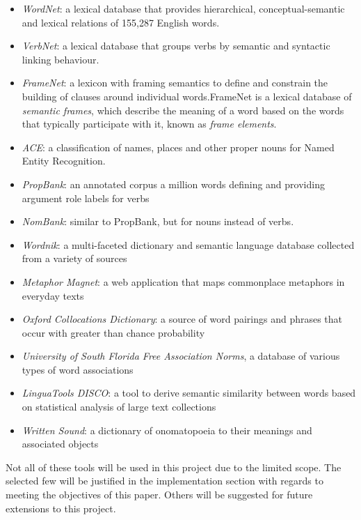 \begin{itemize}
\item{\textit{WordNet}: a lexical database that provides hierarchical, conceptual-semantic and lexical relations of 155,287 English words.\cite{miller1995wordnet}}
\item{\textit{VerbNet}: a lexical database that groups verbs by semantic and syntactic linking behaviour.\cite{schuler2005verbnet}}
\item{\textit{FrameNet}: a lexicon with framing semantics to define and constrain the building of clauses around individual words.FrameNet\cite{baker1998berkeley} is a lexical database of \textit{semantic frames}, which describe the meaning of a word based on the words that typically participate with it, known as \textit{frame elements}.\cite{baker1998berkeley}}
\item{\textit{ACE}: a classification of names, places and other proper nouns for Named Entity Recognition.\cite{doddington2004automatic}}
\item{\textit{PropBank}: an annotated corpus a million words defining and providing argument role labels for verbs\cite{kingsbury2002treebank}}
\item{\textit{NomBank}: similar to PropBank, but for nouns instead of verbs.\cite{meyers2004nombank}}
\item{\textit{Wordnik}: a multi-faceted dictionary and semantic language database collected from a variety of sources\cite{wordnik}}
\item{\textit{Metaphor Magnet}: a web application that maps commonplace metaphors in everyday texts\cite{vealespecifying}}
\item{\textit{Oxford Collocations Dictionary}: a source of word pairings and phrases that occur with greater than chance probability\cite{crowther2003oxford}}
\item{\textit{University of South Florida Free Association Norms}, a database of various types of word associations\cite{nelson2004university}}
\item{\textit{LinguaTools DISCO}: a tool to derive semantic similarity between words based on statistical analysis of large text collections\cite{kolb2008disco}}
\item{\textit{Written Sound}: a dictionary of onomatopoeia to their meanings and associated objects\cite{onomat}}
\end{itemize}

Not all of these tools will be used in this project due to the limited scope. The selected few will be justified in the implementation section with regards to meeting the objectives of this paper. Others will be suggested for future extensions to this project.

